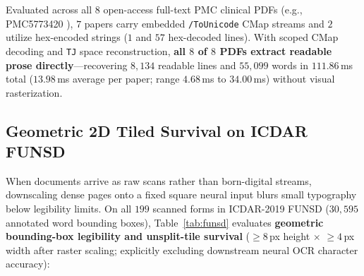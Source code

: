 \documentclass{article}
\begin{document}
Evaluated across all $8$ open-access full-text PMC clinical PDFs (e.g., PMC5773420 \citep{miu_2017_pmc5773420}), $7$ papers carry embedded \texttt{/ToUnicode} CMap streams and $2$ utilize hex-encoded strings ($1$ and $57$ hex-decoded lines). With scoped CMap decoding and \texttt{TJ} space reconstruction, \textbf{all $8$ of $8$ PDFs extract readable prose directly}---recovering $8,134$ readable lines and $55,099$ words in $111.86$\,ms total ($13.98$\,ms average per paper; range $4.68$\,ms to $34.00$\,ms) without visual rasterization.

\subsection{Geometric 2D Tiled Survival on ICDAR FUNSD}
When documents arrive as raw scans rather than born-digital streams, downscaling dense pages onto a fixed square neural input blurs small typography below legibility limits. On all $199$ scanned forms in ICDAR-2019 FUNSD \citep{jaume2019funsd} ($30,595$ annotated word bounding boxes), Table~\ref{tab:funsd} evaluates \textbf{geometric bounding-box legibility and unsplit-tile survival} ($\ge 8$\,px height $\times$ $\ge 4$\,px width after raster scaling; explicitly excluding downstream neural OCR character accuracy):

\begin{table}[t]
\caption{Geometric word-box survival across $199$ ICDAR FUNSD scans ($30,595$ ground-truth boxes; $\ge 8\times 4$\,px legibility threshold).}
\label{tab:funsd}
\vskip 0.08in
\begin{center}
\end{center}
\vskip -0.14in
\end{table}
\end{document}
